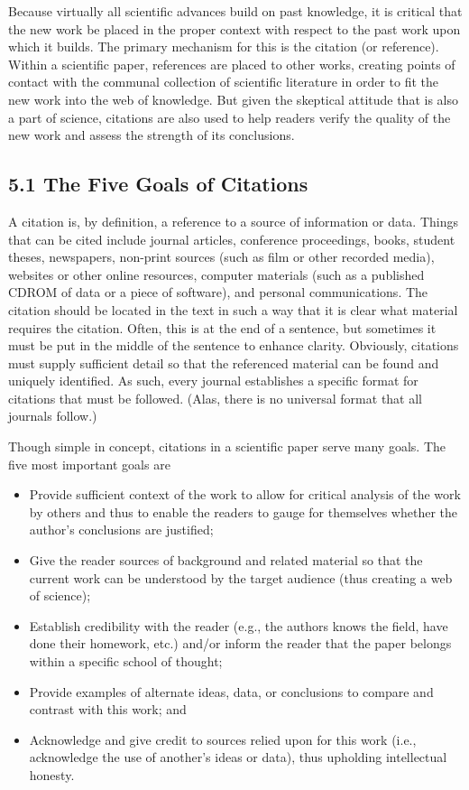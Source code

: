 Because virtually all scientific advances build on past knowledge, it is critical that the new work be placed in the proper context with respect to the past work upon which it builds. The primary mechanism for this is the citation (or reference). Within a scientific paper, references are placed to other works, creating points of contact with the communal collection of scientific literature in order to fit the new work into the web of knowledge. But given the skeptical attitude that is also a part of science, citations are also used to help readers verify the quality of the new work and assess the strength of its conclusions.

\subsection*{5.1 The Five Goals of Citations}
A citation is, by definition, a reference to a source of information or data. Things that can be cited include journal articles, conference proceedings, books, student theses, newspapers, non-print sources (such as film or other recorded media), websites or other online resources, computer materials (such as a published CDROM of data or a piece of software), and personal communications. The citation should be located in the text in such a way that it is clear what material requires the citation. Often, this is at the end of a sentence, but sometimes it must be put in the middle of the sentence to enhance clarity. Obviously, citations must supply sufficient detail so that the referenced material can be found and uniquely identified. As such, every journal establishes a specific format for citations that must be followed. (Alas, there is no universal format that all journals follow.)

Though simple in concept, citations in a scientific paper serve many goals. The five most important goals are

\begin{itemize}
  \item Provide sufficient context of the work to allow for critical analysis of the work by others and thus to enable the readers to gauge for themselves whether the author's conclusions are justified;
  \item Give the reader sources of background and related material so that the current work can be understood by the target audience (thus creating a web of science);
  \item Establish credibility with the reader (e.g., the authors knows the field, have done their homework, etc.) and/or inform the reader that the paper belongs within a specific school of thought;
  \item Provide examples of alternate ideas, data, or conclusions to compare and contrast with this work; and
  \item Acknowledge and give credit to sources relied upon for this work (i.e., acknowledge the use of another's ideas or data), thus upholding intellectual honesty.
\end{itemize}

